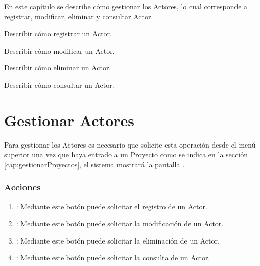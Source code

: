 
En este capítulo se describe cómo gestionar los Actores, lo cual corresponde a registrar, modificar, eliminar y
consultar Actor.\\


\begin{objetivos}
	\item Describir cómo registrar un Actor.
	\item Describir cómo modificar un Actor.
	\item Describir cómo eliminar un Actor.
	\item Describir cómo consultar un Actor.
\end{objetivos}

\section{Gestionar Actores}

Para gestionar los Actores es necesario que solicite esta operación desde el menú superior una vez que haya entrado a un Proyecto como se indica en la sección \ref{cap:gestionarProyectos}, el sistema mostrará la pantalla .


\subsubsection{Acciones}

\begin{enumerate}
	\item {}: Mediante este botón puede solicitar el registro de un Actor.
	\item {}: Mediante este botón puede solicitar la modificación de un Actor.
	\item {}: Mediante este botón puede solicitar la eliminación de un Actor.
	\item {}: Mediante este botón puede solicitar la consulta de un Actor.
\end{enumerate}






